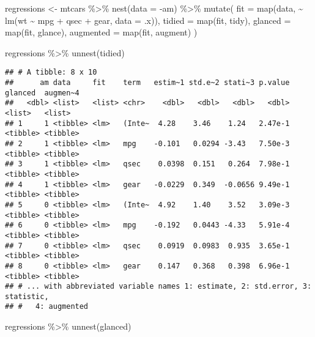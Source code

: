 \documentclass[
]{book}
\newenvironment{Shaded}{\begin{snugshade}}{\end{snugshade}}
\newcommand{\AttributeTok}[1]{\textcolor[rgb]{0.77,0.63,0.00}{#1}}
\newcommand{\FunctionTok}[1]{\textcolor[rgb]{0.00,0.00,0.00}{#1}}
\newcommand{\NormalTok}[1]{#1}
\newcommand{\OtherTok}[1]{\textcolor[rgb]{0.56,0.35,0.01}{#1}}
\newcommand{\SpecialCharTok}[1]{\textcolor[rgb]{0.00,0.00,0.00}{#1}}
\begin{document}
\begin{Shaded}
\begin{Highlighting}[]
\NormalTok{regressions }\OtherTok{\textless{}{-}}\NormalTok{ mtcars }\SpecialCharTok{\%\textgreater{}\%}
  \FunctionTok{nest}\NormalTok{(}\AttributeTok{data =} \SpecialCharTok{{-}}\NormalTok{am) }\SpecialCharTok{\%\textgreater{}\%}
  \FunctionTok{mutate}\NormalTok{(}
    \AttributeTok{fit =} \FunctionTok{map}\NormalTok{(data, }\SpecialCharTok{\textasciitilde{}} \FunctionTok{lm}\NormalTok{(wt }\SpecialCharTok{\textasciitilde{}}\NormalTok{ mpg }\SpecialCharTok{+}\NormalTok{ qsec }\SpecialCharTok{+}\NormalTok{ gear, }\AttributeTok{data =}\NormalTok{ .x)),}
    \AttributeTok{tidied =} \FunctionTok{map}\NormalTok{(fit, tidy),}
    \AttributeTok{glanced =} \FunctionTok{map}\NormalTok{(fit, glance),}
    \AttributeTok{augmented =} \FunctionTok{map}\NormalTok{(fit, augment)}
\NormalTok{  )}

\NormalTok{regressions }\SpecialCharTok{\%\textgreater{}\%}
  \FunctionTok{unnest}\NormalTok{(tidied)}
\end{Highlighting}
\end{Shaded}

\begin{verbatim}
## # A tibble: 8 x 10
##      am data     fit    term   estim~1 std.e~2 stati~3 p.value glanced  augmen~4
##   <dbl> <list>   <list> <chr>    <dbl>   <dbl>   <dbl>   <dbl> <list>   <list>  
## 1     1 <tibble> <lm>   (Inte~  4.28    3.46    1.24   2.47e-1 <tibble> <tibble>
## 2     1 <tibble> <lm>   mpg    -0.101   0.0294 -3.43   7.50e-3 <tibble> <tibble>
## 3     1 <tibble> <lm>   qsec    0.0398  0.151   0.264  7.98e-1 <tibble> <tibble>
## 4     1 <tibble> <lm>   gear   -0.0229  0.349  -0.0656 9.49e-1 <tibble> <tibble>
## 5     0 <tibble> <lm>   (Inte~  4.92    1.40    3.52   3.09e-3 <tibble> <tibble>
## 6     0 <tibble> <lm>   mpg    -0.192   0.0443 -4.33   5.91e-4 <tibble> <tibble>
## 7     0 <tibble> <lm>   qsec    0.0919  0.0983  0.935  3.65e-1 <tibble> <tibble>
## 8     0 <tibble> <lm>   gear    0.147   0.368   0.398  6.96e-1 <tibble> <tibble>
## # ... with abbreviated variable names 1: estimate, 2: std.error, 3: statistic,
## #   4: augmented
\end{verbatim}

\begin{Shaded}
\begin{Highlighting}[]
\NormalTok{regressions }\SpecialCharTok{\%\textgreater{}\%}
  \FunctionTok{unnest}\NormalTok{(glanced)}
\end{Highlighting}
\end{Shaded}
\end{document}

